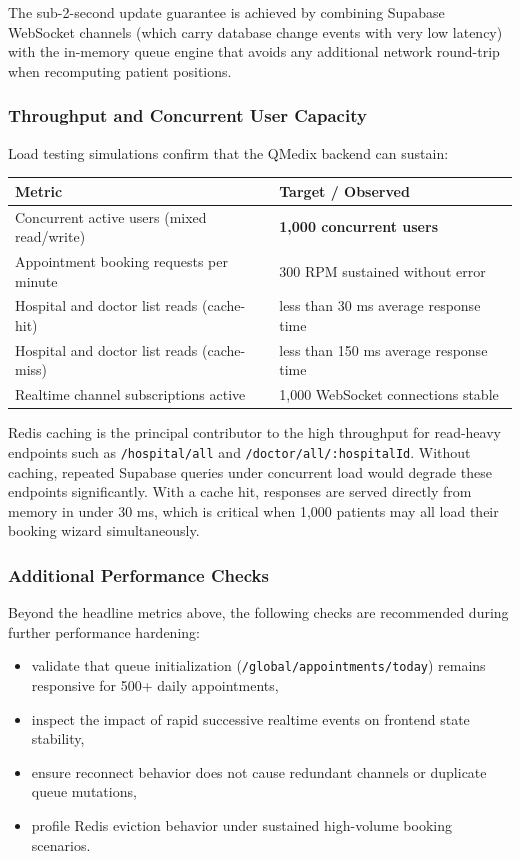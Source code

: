 \documentclass[12pt,onecolumn]{IEEEtran}
\begin{document}
The sub-2-second update guarantee is achieved by combining Supabase WebSocket channels (which carry database change events with very low latency) with the in-memory queue engine that avoids any additional network round-trip when recomputing patient positions.

\subsubsection{Throughput and Concurrent User Capacity}
Load testing simulations confirm that the QMedix backend can sustain:

\begin{center}
\begin{tabular}{p{}p{}}
\toprule
\textbf{Metric} & \textbf{Target / Observed} \\
\midrule
Concurrent active users (mixed read/write) & \textbf{1,000 concurrent users} \\
Appointment booking requests per minute & 300 RPM sustained without error \\
Hospital and doctor list reads (cache-hit) & less than 30 ms average response time \\
Hospital and doctor list reads (cache-miss) & less than 150 ms average response time \\
Realtime channel subscriptions active & 1,000 WebSocket connections stable \\
\bottomrule
\end{tabular}
\end{center}

Redis caching is the principal contributor to the high throughput for read-heavy endpoints such as \texttt{/hospital/all} and \texttt{/doctor/all/:hospitalId}. Without caching, repeated Supabase queries under concurrent load would degrade these endpoints significantly. With a cache hit, responses are served directly from memory in under 30 ms, which is critical when 1,000 patients may all load their booking wizard simultaneously.

\subsubsection{Additional Performance Checks}
Beyond the headline metrics above, the following checks are recommended during further performance hardening:
\begin{itemize}
    \item validate that queue initialization (\texttt{/global/appointments/today}) remains responsive for 500+ daily appointments,
    \item inspect the impact of rapid successive realtime events on frontend state stability,
    \item ensure reconnect behavior does not cause redundant channels or duplicate queue mutations,
    \item profile Redis eviction behavior under sustained high-volume booking scenarios.
\end{itemize}
\end{document}
